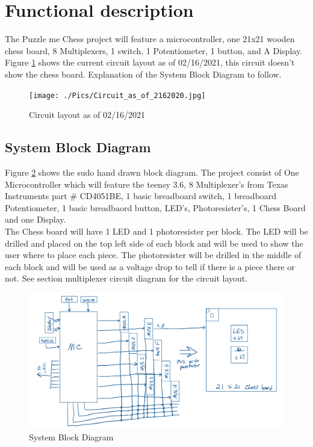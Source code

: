 \documentclass[11pt]{article}
\begin{document}
\section{Functional description}
The Puzzle me Chess project will feature a microcontroller, one 21x21 wooden chess board, 8 Multiplexers, 1 switch, 1 Potentiometer, 1 button, and A Display. Figure \ref{fig:Circuit} shows  the current circuit layout as of 02/16/2021, this circuit doesn't show the chess board. Explanation of the System Block Diagram to follow.

\begin{figure}
  \texttt{[image: ./Pics/Circuit\_as\_of\_2162020.jpg]}
  \caption{Circuit layout as of 02/16/2021}
  \label{fig:Circuit}
\end{figure}

\subsection{System Block Diagram}
Figure \ref{fig:SBD1} shows the sudo hand drawn block diagram. The project consist of One Microcontroller which will feature the teensy 3.6, 8 Multiplexer's from Texas Instruments part \# CD4051BE, 1 basic breadboard switch, 1 breadboard Potentiometer, 1 basic breadbaord button, LED's, Photoresister's, 1 Chess Board and one Display. 
\\


\noindent The Chess board will have 1 LED and 1 photoresister per block. The LED will be drilled and placed on the top left side of each block and will be used to show the user where to place each piece. The photoresister will be drilled in the middle of each block and will be used as a voltage drop to tell if there is a piece there or not. See section multiplexer circuit diagram for the circuit layout. 

\begin{figure}
  \includegraphics[width=\linewidth]{./Pics/System_Block_Diagram.PNG}
  \caption{System Block Diagram}
  \label{fig:SBD1}
\end{figure}
\end{document}
